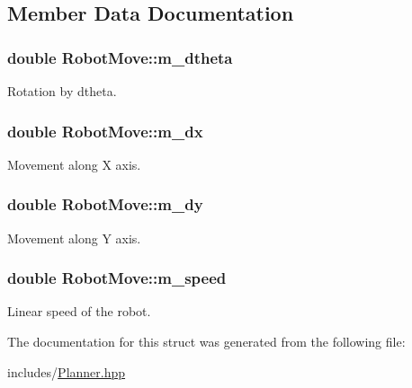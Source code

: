 \subsection{Member Data Documentation}
\hypertarget{structRobotMove_a667d60a557ec5177f77cd0bcf98ba84b}{
\subsubsection[{m\-\_\-dtheta}]{\setlength{\rightskip}{0pt plus 5cm}double Robot\-Move\-::m\-\_\-dtheta}}\label{structRobotMove_a667d60a557ec5177f77cd0bcf98ba84b}
Rotation by dtheta. \hypertarget{structRobotMove_aeb93adca1b150538c56a548fb3a060f7}{
\subsubsection[{m\-\_\-dx}]{\setlength{\rightskip}{0pt plus 5cm}double Robot\-Move\-::m\-\_\-dx}}\label{structRobotMove_aeb93adca1b150538c56a548fb3a060f7}
Movement along X axis. \hypertarget{structRobotMove_a8da71ddc10ffe34d3cc0f9d0cb26e33c}{
\subsubsection[{m\-\_\-dy}]{\setlength{\rightskip}{0pt plus 5cm}double Robot\-Move\-::m\-\_\-dy}}\label{structRobotMove_a8da71ddc10ffe34d3cc0f9d0cb26e33c}
Movement along Y axis. \hypertarget{structRobotMove_a9b6595c240cc17c54b4436c592c5c6b9}{
\subsubsection[{m\-\_\-speed}]{\setlength{\rightskip}{0pt plus 5cm}double Robot\-Move\-::m\-\_\-speed}}\label{structRobotMove_a9b6595c240cc17c54b4436c592c5c6b9}
Linear speed of the robot. 

The documentation for this struct was generated from the following file\-:\begin{DoxyCompactItemize}
\item 
includes/\hyperlink{Planner_8hpp}{Planner.\-hpp}\end{DoxyCompactItemize}
